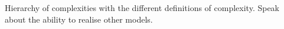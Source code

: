 Hierarchy of complexities with the different definitions of complexity. Speak about the ability to realise other models.